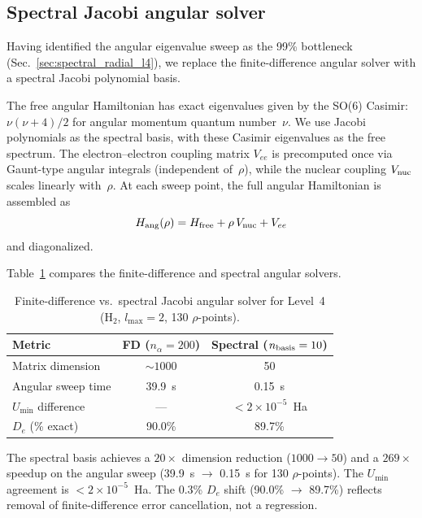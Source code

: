 \documentclass[aps,pra,twocolumn,superscriptaddress,longbibliography]{revtex4-2}
\begin{document}
\subsection{Spectral Jacobi angular solver}
\label{sec:spectral_angular_l4}

Having identified the angular eigenvalue sweep as the 99\% bottleneck
(Sec.~\ref{sec:spectral_radial_l4}), we replace the finite-difference
angular solver with a spectral Jacobi polynomial basis.

The free angular Hamiltonian has exact eigenvalues given by the SO(6)
Casimir: $\nu(\nu+4)/2$ for angular momentum quantum number~$\nu$.
We use Jacobi polynomials as the spectral basis, with these Casimir
eigenvalues as the free spectrum.  The electron--electron coupling
matrix $V_{ee}$ is precomputed once via Gaunt-type angular integrals
(independent of~$\rho$), while the nuclear coupling $V_{\rm nuc}$
scales linearly with~$\rho$.  At each sweep point, the full angular
Hamiltonian is assembled as
\begin{equation}
  H_{\rm ang}(\rho) = H_{\rm free} + \rho \, V_{\rm nuc} + V_{ee}
\end{equation}
and diagonalized.

Table~\ref{tab:spectral_angular_l4} compares the finite-difference
and spectral angular solvers.

\begin{table}[h]
\caption{Finite-difference vs.\ spectral Jacobi angular solver for
Level~4 (H$_2$, $l_{\max} = 2$, 130 $\rho$-points).}
\label{tab:spectral_angular_l4}
\begin{ruledtabular}
\begin{tabular}{lcc}
  Metric & FD ($n_\alpha = 200$) & Spectral ($n_{\rm basis} = 10$) \\
  \hline
  Matrix dimension      & ${\sim}1000$ & 50 \\
  Angular sweep time    & 39.9~s       & 0.15~s \\
  $U_{\min}$ difference & ---          & $< 2 \times 10^{-5}$~Ha \\
  $D_e$ (\% exact)      & 90.0\%       & 89.7\% \\
\end{tabular}
\end{ruledtabular}
\end{table}

The spectral basis achieves a $20\times$ dimension reduction
($1000 \to 50$) and a $269\times$ speedup on the angular sweep
(39.9~s $\to$ 0.15~s for 130 $\rho$-points).  The $U_{\min}$
agreement is $< 2 \times 10^{-5}$~Ha.  The 0.3\% $D_e$ shift
(90.0\% $\to$ 89.7\%) reflects removal of finite-difference error
cancellation, not a regression.
\end{document}
